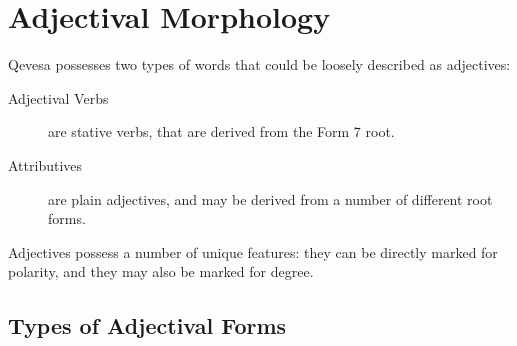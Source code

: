 \documentclass[grammar]{subfiles}
\begin{document}
  \chapter{Adjectival Morphology}
  \label{ch:adjectival-morphology}

  Qevesa possesses two types of words that could be loosely described as adjectives:

  \begin{description}
    \item[Adjectival Verbs] are stative verbs, that are derived from the Form 7 root.
    \item[Attributives] are plain adjectives, and may be derived from a number of different root forms.
  \end{description}

  Adjectives possess a number of unique features: they can be directly marked for polarity, and they may also be marked for degree.


  \section{Types of Adjectival Forms}
  \label{sec:am_adjectival_forms}
\end{document}
